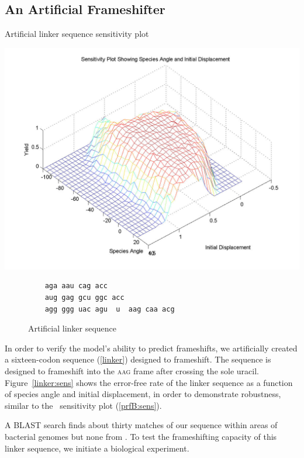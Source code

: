 \documentclass[12pt]{article}
\numberwithin{equation}{section}
\begin{document}
\subsection{An Artificial Frameshifter}
\begin{cfigure}
  \caption{Artificial linker sequence sensitivity plot}
  \label{linker:sens}
  \includegraphics[scale=0.25]{linker/sensitivity}
\end{cfigure}

\begin{figure}
  \caption{Artificial linker sequence}
  \label{linker}
  \begin{verbatim}
    aga aau cag acc
    aug gag gcu ggc acc
    agg ggg uac agu  u  aag caa acg
  \end{verbatim}
\end{figure}

In order to verify the model's ability to predict frameshifts, we
artificially created a sixteen-codon sequence (\autoref{linker})
designed to frameshift.  The sequence is designed to frameshift into
the \textsc{aag} frame after crossing the sole uracil.  Figure~\ref{linker:sens}
shows the error-free rate of the linker sequence as a function of species
angle and initial displacement, in order to demonstrate robustness,
similar to the \prfB\ sensitivity plot (\autoref{prfB:sens}).

A BLAST search finds about thirty matches of our sequence within areas of
bacterial genomes but none from \ecoli. To test the frameshifting capacity of
this linker sequence, we initiate a biological experiment.
\end{document}
